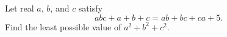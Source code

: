 Let real  $a$, $b$, and $c$ satisfy $$abc+a+b+c=ab+bc+ca+5.$$Find the least possible value of $a^2+b^2+c^2$.